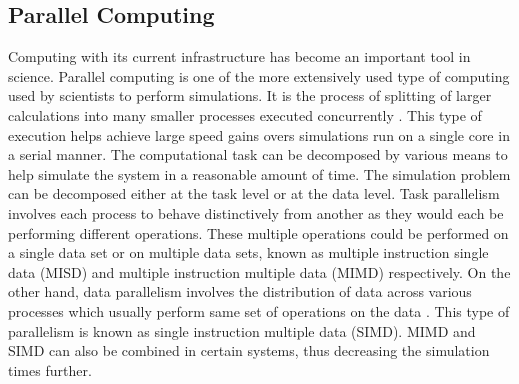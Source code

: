 \documentclass[preprint,10pt,authoryear,review]{elsarticle}
\begin{document}


\subsection{Parallel Computing}
Computing with its current infrastructure has become an important tool in science. 
Parallel computing is one of the more extensively used type of computing used by scientists 
to perform simulations. It is the process of splitting of larger calculations into 
many smaller processes executed concurrently \citep{Almasi1989}. This type of execution 
helps achieve large speed gains overs simulations run on a single core in a serial manner.
The computational task can be decomposed by various means to help simulate the system 
in a reasonable amount of time. The simulation problem can be decomposed either 
at the task level or at the data level. Task parallelism involves each process to 
behave distinctively from another as they would each be performing different operations. 
These multiple operations could be performed on a single data set or on multiple data 
sets, known as multiple instruction single data (MISD) and multiple instruction 
multiple data (MIMD) respectively. On the other hand, data parallelism 
involves the distribution of data across various processes which usually perform same set of 
operations on the data \citep{solihin2015}. This type of parallelism is known 
as single instruction multiple data (SIMD). MIMD and SIMD can also 
be combined in certain systems, thus decreasing the simulation times further.
\end{document}
